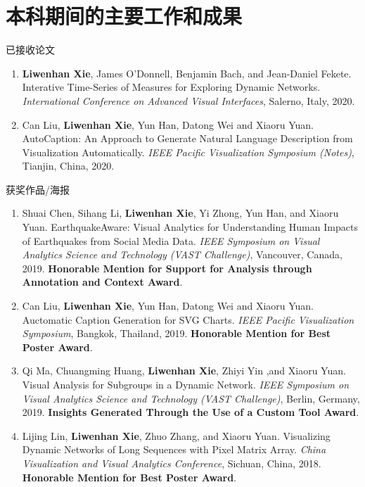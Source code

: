 \chapter{本科期间的主要工作和成果}

\noindent 已接收论文
\begin{enumerate}
	\item \textbf{Liwenhan Xie}, James O'Donnell, Benjamin Bach, and Jean-Daniel Fekete. Interative Time-Series of Measures for Exploring Dynamic Networks. \emph{International Conference on Advanced Visual Interfaces}, Salerno, Italy, 2020.
	\item Can Liu, \textbf{Liwenhan Xie}, Yun Han, Datong Wei and Xiaoru Yuan. AutoCaption: An Approach to Generate Natural Language Description from Visualization Automatically. \emph{IEEE Pacific Visualization Symposium (Notes)}, Tianjin, China, 2020.
\end{enumerate}

\noindent 获奖作品/海报
\begin{enumerate}
	\item Shuai Chen, Sihang Li, \textbf{Liwenhan Xie}, Yi Zhong, Yun Han, and Xiaoru Yuan. EarthquakeAware: Visual Analytics for Understanding Human Impacts of Earthquakes from Social Media Data. \emph{IEEE Symposium on Visual Analytics Science and Technology (VAST Challenge)}, Vancouver, Canada, 2019. \textbf{Honorable Mention for Support for Analysis through Annotation and Context Award}.
	\item Can Liu, \textbf{Liwenhan Xie}, Yun Han, Datong Wei and Xiaoru Yuan. Auctomatic Caption Generation for SVG Charts. \emph{IEEE Pacific Visualization Symposium}, Bangkok, Thailand, 2019. \textbf{Honorable Mention for Best Poster Award}.
	\item Qi Ma, Chuangming Huang, \textbf{Liwenhan Xie}, Zhiyi Yin ,and Xiaoru Yuan.  Visual Analysis for Subgroups in a Dynamic Network. \emph{IEEE Symposium on Visual Analytics Science and Technology (VAST Challenge)}, Berlin, Germany, 2019. \textbf{Insights Generated Through the Use of a Custom Tool Award}.
	\item Lijing Lin, \textbf{Liwenhan Xie}, Zhuo Zhang, and Xiaoru Yuan. Visualizing Dynamic Networks of Long Sequences with Pixel Matrix Array. \emph{China Visualization and Visual Analytics Conference}, Sichuan, China, 2018. \textbf{Honorable Mention for Best Poster Award}.

\end{enumerate}
